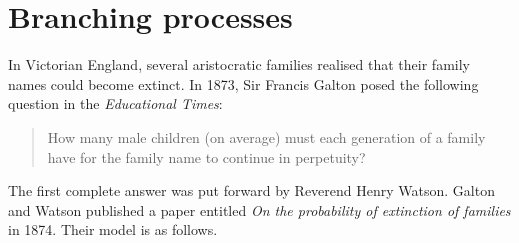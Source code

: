 %


\section{Branching processes}\label{sec:branching}
In Victorian England, several aristocratic families realised that their family names could become extinct. In 1873, Sir Francis Galton posed the following question in the \textit{Educational Times}:
\begin{quote}
How many male children (on average) must each generation of a family have for the family name to continue in perpetuity?
\end{quote}
The first complete answer was put forward by Reverend Henry Watson. Galton and Watson published a paper entitled \textit{On the probability of extinction of families} in 1874. Their model is as follows.

